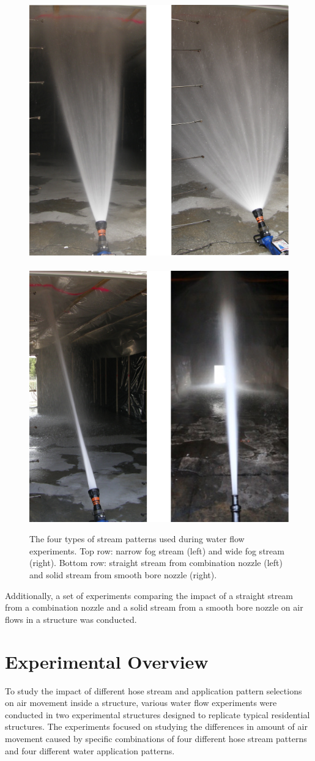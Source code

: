 \documentclass[12pt,oneside]{book}
\begin{document}
\begin{figure}[!ht]
	\includegraphics[width=0.55\columnwidth]{../Figures/Pictures/hose_streams_1}
	\\~\\
	\includegraphics[width=0.55\columnwidth]{../Figures/Pictures/hose_streams_2}
	\caption[Hose stream patterns used in experiments.]{The four types of stream patterns used during water flow experiments. Top row: narrow fog stream (left) and wide fog stream (right). Bottom row: straight stream from combination nozzle (left) and solid stream from smooth bore nozzle (right).}
	\label{fig:hose_streams}
\end{figure}

Additionally, a set of experiments comparing the impact of a straight stream from a combination nozzle and a solid stream from a smooth bore nozzle on air flows in a structure was conducted.

\clearpage

\chapter{Experimental Overview}
\label{chap:exp_overview}
To study the impact of different hose stream and application pattern selections on air movement inside a structure, various water flow experiments were conducted in two experimental structures designed to replicate typical residential structures. The experiments focused on studying the differences in amount of air movement caused by specific combinations of four different hose stream patterns and four different water application patterns.
\end{document}

